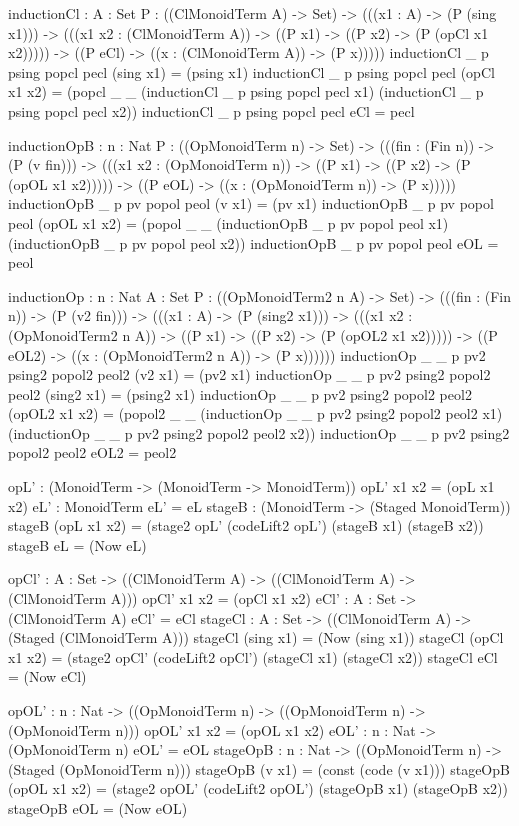 \begin{togcode} 
  inductionCl : {A : Set} {P : ((ClMonoidTerm A) -> Set)} -> 
    (((x1 : A) -> (P (sing x1))) -> 
    (((x1 x2 : (ClMonoidTerm A)) -> 
      ((P x1) -> ((P x2) -> (P (opCl x1 x2))))) -> 
    ((P eCl) -> ((x : (ClMonoidTerm A)) -> (P x)))))
  inductionCl {_} {p} psing popcl pecl (sing x1) = (psing x1) 
  inductionCl {_} {p} psing popcl pecl (opCl x1 x2) = 
    (popcl _ _ (inductionCl {_} {p} psing popcl pecl x1) 
               (inductionCl {_} {p} psing popcl pecl x2)) 
  inductionCl {_} {p} psing popcl pecl eCl = pecl 
  
  inductionOpB : {n : Nat} {P : ((OpMonoidTerm n) -> Set)} -> 
    (((fin : (Fin n)) -> (P (v fin))) -> 
    (((x1 x2 : (OpMonoidTerm n)) -> 
      ((P x1) -> ((P x2) -> (P (opOL x1 x2))))) -> 
    ((P eOL) -> ((x : (OpMonoidTerm n)) -> (P x)))))
  inductionOpB {_} {p} pv popol peol (v x1) = (pv x1) 
  inductionOpB {_} {p} pv popol peol (opOL x1 x2) = 
    (popol _ _ (inductionOpB {_} {p} pv popol peol x1) 
               (inductionOpB {_} {p} pv popol peol x2)) 
  inductionOpB {_} {p} pv popol peol eOL = peol 
\end{togcode} 
\begin{togcode}  
  inductionOp : {n : Nat} {A : Set} {P : ((OpMonoidTerm2 n A) -> Set)} -> 
    (((fin : (Fin n)) -> (P (v2 fin))) -> 
    (((x1 : A) -> (P (sing2 x1))) -> 
    (((x1 x2 : (OpMonoidTerm2 n A)) -> 
      ((P x1) -> ((P x2) -> (P (opOL2 x1 x2))))) -> 
    ((P eOL2) -> ((x : (OpMonoidTerm2 n A)) -> (P x))))))
  inductionOp {_} {_} {p} pv2 psing2 popol2 peol2 (v2 x1) = (pv2 x1) 
  inductionOp {_} {_} {p} pv2 psing2 popol2 peol2 (sing2 x1) = (psing2 x1) 
  inductionOp {_} {_} {p} pv2 psing2 popol2 peol2 (opOL2 x1 x2) = 
    (popol2 _ _ (inductionOp {_} {_} {p} pv2 psing2 popol2 peol2 x1) 
                (inductionOp {_} {_} {p} pv2 psing2 popol2 peol2 x2)) 
  inductionOp {_} {_} {p} pv2 psing2 popol2 peol2 eOL2 = peol2 

  opL' : (MonoidTerm -> (MonoidTerm -> MonoidTerm))
  opL' x1 x2 = (opL x1 x2) 
  eL' : MonoidTerm
  eL'  = eL 
  stageB : (MonoidTerm -> (Staged MonoidTerm))
  stageB (opL x1 x2) = 
    (stage2 opL' (codeLift2 opL') (stageB x1) (stageB x2)) 
  stageB eL = (Now eL) 
\end{togcode}
\begin{togcode} 
  opCl' : {A : Set} -> 
       ((ClMonoidTerm A) -> ((ClMonoidTerm A) -> (ClMonoidTerm A)))
  opCl' x1 x2 = (opCl x1 x2) 
  eCl' : {A : Set} -> (ClMonoidTerm A)
  eCl'  = eCl 
  stageCl : {A : Set} -> ((ClMonoidTerm A) -> (Staged (ClMonoidTerm A)))
  stageCl (sing x1) = (Now (sing x1)) 
  stageCl (opCl x1 x2) = 
    (stage2 opCl' (codeLift2 opCl') (stageCl x1) (stageCl x2)) 
  stageCl eCl = (Now eCl) 

  opOL' : {n : Nat} -> 
       ((OpMonoidTerm n) -> ((OpMonoidTerm n) -> (OpMonoidTerm n)))
  opOL' x1 x2 = (opOL x1 x2) 
  eOL' : {n : Nat} -> (OpMonoidTerm n)
  eOL'  = eOL 
  stageOpB : {n : Nat} -> ((OpMonoidTerm n) -> (Staged (OpMonoidTerm n)))
  stageOpB (v x1) = (const (code (v x1))) 
  stageOpB (opOL x1 x2) = 
    (stage2 opOL' (codeLift2 opOL') (stageOpB x1) (stageOpB x2)) 
  stageOpB eOL = (Now eOL) 
\end{togcode} 
